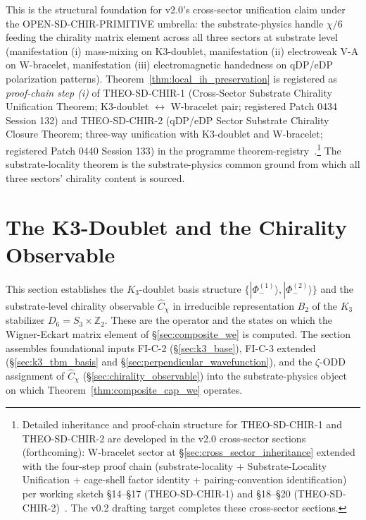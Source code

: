 \documentclass[11pt,letterpaper]{article}
\newcommand{\Kthree}{\ensuremath{K_3}}
\newcommand{\Cchi}{\hat{C}_\chi}
\newcommand{\PhiminusOne}{|\Phi_-^{(1)}\rangle}
\newcommand{\PhiminusTwo}{|\Phi_-^{(2)}\rangle}
\newcommand{\Dsix}{D_6}
\newcommand{\Sthree}{S_3}
\begin{document}
This is the structural foundation for v2.0's cross-sector unification claim under the OPEN-SD-CHIR-PRIMITIVE umbrella: the substrate-physics handle $\chi/6$ feeding the chirality matrix element across all three sectors at substrate level (manifestation (i) mass-mixing on K3-doublet, manifestation (ii) electroweak V-A on W-bracelet, manifestation (iii) electromagnetic handedness on qDP/eDP polarization patterns). Theorem~\ref{thm:local_ih_preservation} is registered as \emph{proof-chain step (i)} of THEO-SD-CHIR-1 (Cross-Sector Substrate Chirality Unification Theorem; K3-doublet $\leftrightarrow$ W-bracelet pair; registered Patch 0434 Session 132) and THEO-SD-CHIR-2 (qDP/eDP Sector Substrate Chirality Closure Theorem; three-way unification with K3-doublet and W-bracelet; registered Patch 0440 Session 133) in the programme theorem-registry~\cite{abshier_theorem_registry}.\footnote{Detailed inheritance and proof-chain structure for THEO-SD-CHIR-1 and THEO-SD-CHIR-2 are developed in the v2.0 cross-sector sections (forthcoming): W-bracelet sector at \S\ref{sec:cross_sector_inheritance} extended with the four-step proof chain (substrate-locality + Substrate-Locality Unification + cage-shell factor identity + pairing-convention identification) per working sketch \S14--\S17 (THEO-SD-CHIR-1) and \S18--\S20 (THEO-SD-CHIR-2)~\cite{abshier_capotauro_chiral_mechanism_sketch}. The v0.2 drafting target completes these cross-sector sections.} The substrate-locality theorem is the substrate-physics common ground from which all three sectors' chirality content is sourced.

\section{The K3-Doublet and the Chirality Observable}\label{sec:k3_doublet}

This section establishes the $\Kthree$-doublet basis structure $\{\PhiminusOne, \PhiminusTwo\}$ and the substrate-level chirality observable $\Cchi$ in irreducible representation $B_2$ of the $\Kthree$ stabilizer $\Dsix = \Sthree \times \mathbb{Z}_2$. These are the operator and the states on which the Wigner-Eckart matrix element of \S\ref{sec:composite_we} is computed. The section assembles foundational inputs FI-C-2 (\S\ref{sec:k3_base}), FI-C-3 extended (\S\ref{sec:k3_tbm_basis} and \S\ref{sec:perpendicular_wavefunction}), and the $\zeta$-ODD assignment of $\Cchi$ (\S\ref{sec:chirality_observable}) into the substrate-physics object on which Theorem~\ref{thm:composite_cap_we} operates.
\end{document}
